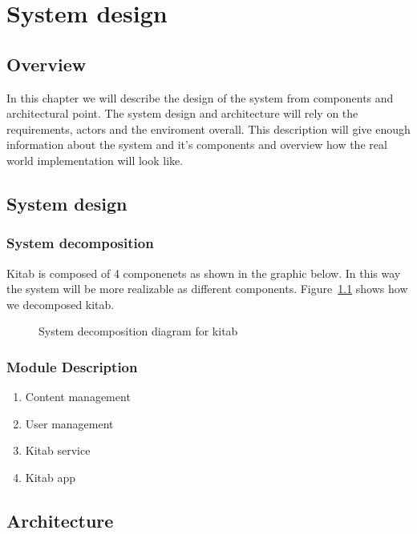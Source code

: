 \chapter{System design}
\section{Overview}

In this chapter we will describe the design of the system from components and architectural point. The system design and architecture will rely on the requirements, actors and the enviroment overall. This description will give enough information about the system and it's components and overview how the real world implementation will look like.

\section{System design}
	\subsection{System decomposition}

Kitab is composed of 4 componenets as shown in the graphic below. In this way the system will be more realizable as different components. Figure~\ref{dia_sys_decomposition} shows how we decomposed kitab.

	\begin{figure}[H]
	\begin{center}

	\caption{System decomposition diagram for kitab}
	\label{dia_sys_decomposition}

	\end{center}
	\end{figure}

	\subsection{Module Description}

	\begin{enumerate}
		\item Content management
		\item User management
		\item Kitab service
		\item Kitab app
	\end{enumerate}

\section{Architecture}
